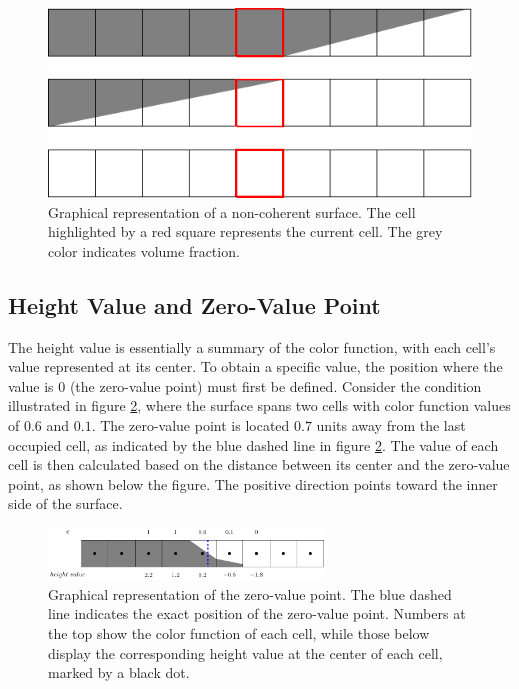 \begin{figure}[H]
  \centering
  \includegraphics{./image/heights-h/nosurface.pdf}
  \caption{Graphical representation of a non-coherent surface. The cell highlighted by a red square represents the current cell. The grey color indicates volume fraction.}
  \label{fig:heights-nosurface}
\end{figure}

\subsection{Height Value and Zero-Value Point}
The height value is essentially a summary of the color function, with each cell’s value represented at its center. To obtain a specific value, the position where the value is $0$ (the zero-value point) must first be defined. Consider the condition illustrated in figure \ref{fig:heights-0position}, where the surface spans two cells with color function values of $0.6$ and $0.1$. The zero-value point is located $0.7$ units away from the last occupied cell, as indicated by the blue dashed line in figure \ref{fig:heights-0position}. The value of each cell is then calculated based on the distance between its center and the zero-value point, as shown below the figure. The positive direction points toward the inner side of the surface.

\begin{figure}[H]
    \centering
    \includegraphics[width=0.65\textwidth]{./image/heights-h/0position}
    \caption{Graphical representation of the zero-value point. The blue dashed line indicates the exact position of the zero-value point. Numbers at the top show the color function of each cell, while those below display the corresponding height value at the center of each cell, marked by a black dot.}
    \label{fig:heights-0position}
\end{figure}


